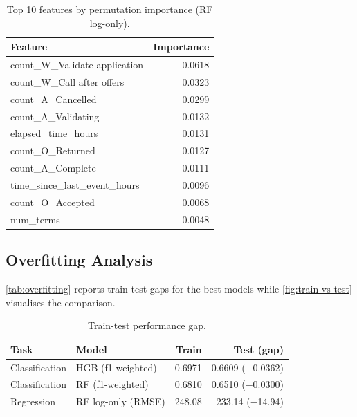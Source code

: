 \documentclass[runningheads]{llncs}
\begin{document}
\begin{table}[H]
    \centering
    \caption{Top 10 features by permutation importance (RF log-only).}
    \label{tab:regression-feature-importance}
    \begin{tabularx}{0.85\textwidth}{lr}
        \toprule
        Feature & Importance \\
        \midrule
        count\_W\_Validate application      & 0.0618 \\
        count\_W\_Call after offers         & 0.0323 \\
        count\_A\_Cancelled                 & 0.0299 \\
        count\_A\_Validating                & 0.0132 \\
        elapsed\_time\_hours                & 0.0131 \\
        count\_O\_Returned                  & 0.0127 \\
        count\_A\_Complete                  & 0.0111 \\
        time\_since\_last\_event\_hours     & 0.0096 \\
        count\_O\_Accepted                  & 0.0068 \\
        num\_terms                          & 0.0048 \\
        \bottomrule
    \end{tabularx}
\end{table}

\subsection{Overfitting Analysis}
\label{sec:overfitting}

\autoref{tab:overfitting} reports train-test gaps for the best models while
\autoref{fig:train-vs-test} visualises the comparison.

\begin{table}[H]
    \centering
    \caption{Train-test performance gap.}
    \label{tab:overfitting}
    \begin{tabularx}{\textwidth}{llrr}
        \toprule
        Task & Model & Train & Test (gap) \\
        \midrule
        Classification & HGB (f1-weighted) & 0.6971 & 0.6609 ($-$0.0362) \\
        Classification & RF (f1-weighted)   & 0.6810 & 0.6510 ($-$0.0300) \\
        Regression     & RF log-only (RMSE) & 248.08 & 233.14 ($-$14.94) \\
        \bottomrule
    \end{tabularx}
\end{table}
\end{document}

